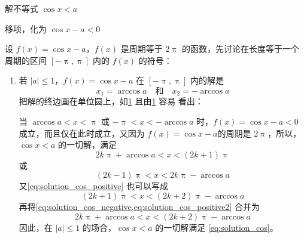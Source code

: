 \begin{example}
  解不等式 $\cos x<a$
\end{example}

\begin{solution}
移项，化为 $\cos x-a<0$

设 $f(x)=\cos x-a$，$f(x)$ 是周期等于 $2\uppi$ 的函数，先讨论在长度等于一个周期的区间 $[-\uppi,\uppi]$ 内的 $f(x)$ 的符号：
\begin{enumerate}
  \item 若 $|a|\leqslant 1$，$f(x)=\cos x-a$ 在 $[-\uppi,\uppi]$ 内的解是
  \[x_1=\arccos a\quad \text{和}\quad x_2=-\arccos a\]
  把解的终边画在单位圆上，如\cref{fig:unit_circle_solution2} 且由\cref{fig:unit_circle_solution2} 容易
看出：
  \begin{figure}
    \caption{}\label{fig:unit_circle_solution2}
  \end{figure}

当 $\arccos a<x<\uppi$ 或 $-\uppi <x<-\arccos a$ 时，$f(x)=\cos x-a<0$ 成立，而且仅在此时成立，又因为 $f(x)=\cos x-a$的周期是 $2\uppi$，所以，$\cos x<a$ 的一切解，满足
\begin{equation}
  \label{eq:solution_cos_negative}
   2k\uppi +\arccos a<x<(2k+1)\uppi  
\end{equation}
或
\begin{equation}
  \label{eq:solution_cos_positive}
    (2k-1)\uppi <x<2k\uppi -\arccos a
\end{equation}
又\cref{eq:solution_cos_positive} 也可以写成
\begin{equation}
  \label{eq:solution_cos_positive2}
    (2k+1)\uppi <x<(2k+2)\uppi -\arccos a
\end{equation}
再将\cref{eq:solution_cos_negative,eq:solution_cos_positive2} 合并为
\begin{equation}
  \label{eq:solution_cos}
  2k\uppi +\arccos a<x<(2k+2)\uppi -\arccos a
\end{equation} 
因此，在 $|a|\leqslant 1$ 的场合，$\cos x<a$ 的一切解满足 \eqref{eq:solution_cos}。


\end{enumerate}
\end{solution}
